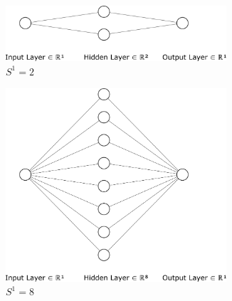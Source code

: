 \begin{figure}[H]
	\centering
	\begin{subfigure}{0.47\textwidth}
		\centering
		\includegraphics[width=0.9\textwidth]{../Problem 4/nn_1_2_1.pdf}
		\caption{$S^1=2$}
	\end{subfigure}
	\begin{subfigure}{0.47\textwidth}
		\centering
		\includegraphics[width=0.9\textwidth]{../Problem 4/nn_1_8_1.pdf}
		\caption{$S^1=8$}
	\end{subfigure}
	\begin{subfigure}{0.47\textwidth}
		\centering

\end{subfigure}
\end{figure}
